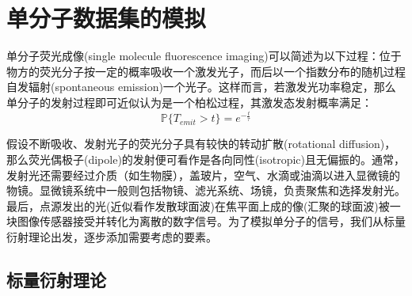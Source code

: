 \documentclass[draft=false,oneside]{fduthesis}
\begin{document}
    \chapter{单分子数据集的模拟}
    单分子荧光成像(single molecule fluorescence imaging)可以简述为以下过程：位于物方的荧光分子按一定的概率吸收一个激发光子，而后以一个指数分布的随机过程自发辐射(spontaneous emission)一个光子。这样而言，若激发光功率稳定，那么单分子的发射过程即可近似认为是一个柏松过程，其激发态发射概率满足：
    \begin{equation}
        \mathbb{P}\{T_{emit}>t\}=e^{-\frac{t}{\tau}}
        \label{emit}
    \end{equation}
    \par 假设不断吸收、发射光子的荧光分子具有较快的转动扩散(rotational diffusion)，那么荧光偶极子(dipole)的发射便可看作是各向同性(isotropic)且无偏振的。通常，发射光还需要经过介质（如生物膜），盖玻片，空气、水滴或油滴以进入显微镜的物镜。显微镜系统中一般则包括物镜、滤光系统、场镜，负责聚焦和选择发射光。最后，点源发出的光(近似看作发散球面波)在焦平面上成的像(汇聚的球面波)被一块图像传感器接受并转化为离散的数字信号。为了模拟单分子的信号，我们从标量衍射理论出发，逐步添加需要考虑的要素。
    \section{标量衍射理论}
\end{document}
